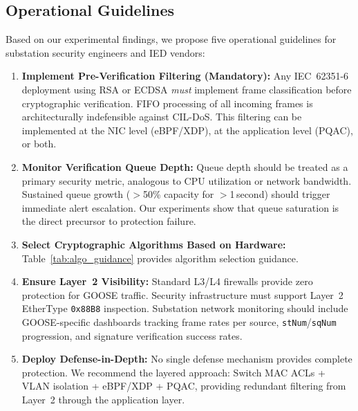 \documentclass{ieeeaccess}
\begin{document}

\subsection{Operational Guidelines}
Based on our experimental findings, we propose five operational guidelines for substation security engineers and IED vendors:

\begin{enumerate}[leftmargin=*]
    \item \textbf{Implement Pre-Verification Filtering (Mandatory):} Any IEC~62351-6 deployment using RSA or ECDSA \emph{must} implement frame classification before cryptographic verification. FIFO processing of all incoming frames is architecturally indefensible against CIL-DoS. This filtering can be implemented at the NIC level (eBPF/XDP), at the application level (PQAC), or both.
    
    \item \textbf{Monitor Verification Queue Depth:} Queue depth should be treated as a primary security metric, analogous to CPU utilization or network bandwidth. Sustained queue growth ($>$50\% capacity for $>$1\,second) should trigger immediate alert escalation. Our experiments show that queue saturation is the direct precursor to protection failure.
    
    \item \textbf{Select Cryptographic Algorithms Based on Hardware:} Table~\ref{tab:algo_guidance} provides algorithm selection guidance.
    
    \item \textbf{Ensure Layer~2 Visibility:} Standard L3/L4 firewalls provide zero protection for GOOSE traffic. Security infrastructure must support Layer~2 EtherType \texttt{0x88B8} inspection. Substation network monitoring should include GOOSE-specific dashboards tracking frame rates per source, \texttt{stNum}/\texttt{sqNum} progression, and signature verification success rates.
    
    \item \textbf{Deploy Defense-in-Depth:} No single defense mechanism provides complete protection. We recommend the layered approach: Switch MAC ACLs + VLAN isolation + eBPF/XDP + PQAC, providing redundant filtering from Layer~2 through the application layer.
\end{enumerate}
\end{document}
